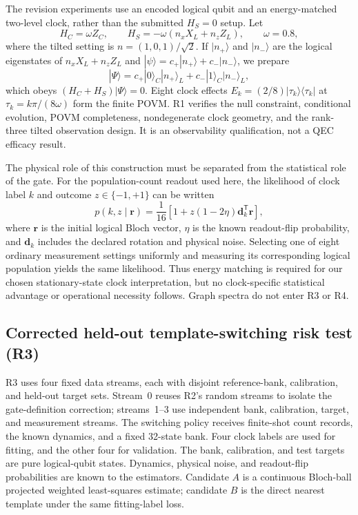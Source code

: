 \documentclass{iopjournal}
\begin{document}
The revision experiments use an encoded logical qubit and an energy-matched
two-level clock, rather than the submitted $H_S=0$ setup.  Let
\begin{equation}
H_C=\omega Z_C,\qquad H_S=-\omega(n_xX_L+n_zZ_L),\qquad \omega=0.8,
\end{equation}
where the tilted setting is $n=(1,0,1)/\sqrt{2}$.  If $|n_+\rangle$ and
$|n_-\rangle$ are the logical eigenstates of $n_xX_L+n_zZ_L$ and
$|\psi\rangle=c_+|n_+\rangle+c_-|n_-\rangle$, we prepare
\begin{equation}
|\Psi\rangle=c_+|0\rangle_C|n_+\rangle_L+c_-|1\rangle_C|n_-\rangle_L,
\label{eq:revision-history-state}
\end{equation}
which obeys $(H_C+H_S)|\Psi\rangle=0$.  Eight clock effects
$E_k=(2/8)|\tau_k\rangle\langle\tau_k|$ at
$\tau_k=k\pi/(8\omega)$ form the finite POVM.  R1 verifies the null constraint,
conditional evolution, POVM completeness, nondegenerate clock geometry, and the
rank-three tilted observation design.  It is an observability qualification, not
a QEC efficacy result.

The physical role of this construction must be separated from the statistical
role of the gate.  For the population-count readout used here, the likelihood
of clock label $k$ and outcome $z\in\{-1,+1\}$ can be written
\begin{equation}
p(k,z\mid\boldsymbol r)
=\frac{1}{16}\left[1+z(1-2\eta)\boldsymbol d_k^{\mathsf T}\boldsymbol r\right],
\label{eq:clock-likelihood}
\end{equation}
where $\boldsymbol r$ is the initial logical Bloch vector, $\eta$ is the
known readout-flip probability, and $\boldsymbol d_k$ includes the declared
rotation and physical noise.  Selecting one of eight ordinary measurement
settings uniformly and measuring its corresponding logical population yields
the same likelihood.  Thus energy matching is required for our chosen
stationary-state clock interpretation, but no clock-specific statistical
advantage or operational necessity follows.  Graph spectra do not enter R3
or R4.

\subsection{Corrected held-out template-switching risk test (R3)}

R3 uses four fixed data streams, each with disjoint reference-bank,
calibration, and held-out target sets.  Stream~0 reuses R2's random streams to
isolate the gate-definition correction; streams~1--3 use independent bank,
calibration, target, and measurement streams.  The switching policy receives
finite-shot count records, the known dynamics, and a fixed 32-state bank.  Four
clock labels are used for fitting, and the other four for validation.
The bank, calibration, and test targets are pure logical-qubit states.
Dynamics, physical noise, and readout-flip probabilities are known to the
estimators.  Candidate $A$ is a continuous Bloch-ball projected weighted least-squares
estimate; candidate $B$ is the direct nearest template under the same
fitting-label loss.
\end{document}
